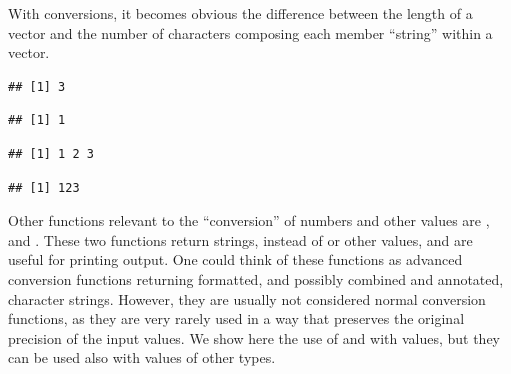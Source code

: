 \documentclass[krantz2]{krantz}\usepackage{knitr}%
\begin{document}
\begin{explainbox}
With conversions, it becomes obvious the difference between the length of a  vector and the number of characters composing each member ``string'' within a vector.

\begin{knitrout}\footnotesize
{}\color{fgcolor}\begin{kframe}
\begin{alltt}
 \hlkwb{<-} \hlstd{(}\hlstd{,} \hlstd{,} \hlstd{)}
\end{alltt}
\begin{verbatim}
## [1] 3
\end{verbatim}
\begin{alltt}
 \hlkwb{<-} 
\end{alltt}
\begin{verbatim}
## [1] 1
\end{verbatim}
\begin{alltt}
\end{alltt}
\begin{verbatim}
## [1] 1 2 3
\end{verbatim}
\begin{alltt}
\end{alltt}
\begin{verbatim}
## [1] 123
\end{verbatim}
\end{kframe}
\end{knitrout}
\end{explainbox}

\sloppy
Other functions relevant to the ``conversion'' of numbers and other values are , and . These two functions return  strings, instead of  or other values, and are useful for printing output. One could think of these functions as advanced conversion functions returning formatted, and possibly combined and annotated, character strings. However, they are usually not considered normal conversion functions, as they are very rarely used in a way that preserves the original precision of the input values. We show here the use of  and  with  values, but they can be used also with values of other types.
\end{document}
